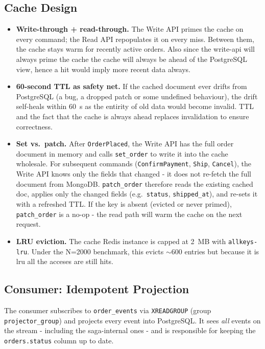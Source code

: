 \documentclass[11pt,a4paper]{article}
\newcommand{\code}[1]{\texttt{\small #1}}
\begin{document}
\subsection{Cache Design}

\begin{itemize}
  \item \textbf{Write-through + read-through.} The Write API primes the cache on every command; the Read API repopulates it on every miss. Between them, the cache stays warm for recently active orders. Also since the write-api will always prime the cache the cache will always be ahead of the PostgreSQL view, hence a hit would imply more recent data always.
  \item \textbf{60-second TTL as safety net.} If the cached document ever drifts from PostgreSQL (a bug, a dropped patch or some undefined behaviour), the drift self-heals within 60~s as the entirity of old data would become invalid. TTL and the fact that the cache is always ahead replaces invalidation to ensure correctness.
   \item \textbf{Set vs.\ patch.}
    After \code{OrderPlaced}, the Write API has the full order document in memory and
    calls \code{set\_order} to write it into the cache wholesale.
    For subsequent commands (\code{ConfirmPayment}, \code{Ship}, \code{Cancel}), the
    Write API knows only the fields that changed - it does not re-fetch the full
    document from MongoDB.
    \code{patch\_order} therefore reads the existing cached doc, applies only the changed
    fields (e.g.\ \code{status}, \code{shipped\_at}), and re-sets it with a refreshed TTL.
    If the key is absent (evicted or never primed), \code{patch\_order} is a no-op -
    the read path will warm the cache on the next request.

  \item \textbf{LRU eviction.} The cache Redis instance is capped at 2~MB with \code{allkeys-lru}. Under the N=2000 benchmark, this evicts $\sim$600 entries but because it is lru all the acceses are still hits.
\end{itemize}

\subsection{Consumer: Idempotent Projection}

The consumer subscribes to \code{order\_events} via \code{XREADGROUP} (group \code{projector\_group}) and projects every event into PostgreSQL. It sees \emph{all} events on the stream - including the saga-internal ones - and is responsible for keeping the \code{orders.status} column up to date.
\end{document}
